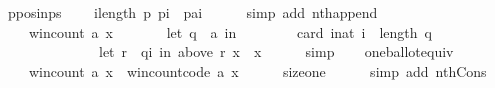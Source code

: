 \begin{isabellebody}
\ p{\isacharunderscore}{\kern0pt}pos{\isacharunderscore}{\kern0pt}in{\isacharunderscore}{\kern0pt}ps{\isacharcolon}{\kern0pt}\isanewline
\ \ \ \ {\isachardoublequoteopen}{\isasymforall}i{\isacharless}{\kern0pt}length\ p{\isachardot}{\kern0pt}\ p{\isacharbang}{\kern0pt}i\ {\isacharequal}{\kern0pt}\ {\isacharparenleft}{\kern0pt}p{\isacharat}{\kern0pt}{\isacharbrackleft}{\kern0pt}a{\isacharbrackright}{\kern0pt}{\isacharparenright}{\kern0pt}{\isacharbang}{\kern0pt}i{\isachardoublequoteclose}\isanewline
\ \ \ \ \isamarkupfalse%
\ {\isacharparenleft}{\kern0pt}simp\ add{\isacharcolon}{\kern0pt}\ nth{\isacharunderscore}{\kern0pt}append{\isacharparenright}{\kern0pt}\isanewline
\ \ \isamarkupfalse%
\isanewline
\ \ \ \ {\isachardoublequoteopen}win{\isacharunderscore}{\kern0pt}count\ {\isacharbrackleft}{\kern0pt}a{\isacharbrackright}{\kern0pt}\ x\ {\isacharequal}{\kern0pt}\isanewline
\ \ \ \ \ \ {\isacharparenleft}{\kern0pt}let\ q\ {\isacharequal}{\kern0pt}\ {\isacharbrackleft}{\kern0pt}a{\isacharbrackright}{\kern0pt}\ in\isanewline
\ \ \ \ \ \ \ \ card\ {\isacharbraceleft}{\kern0pt}i{\isacharcolon}{\kern0pt}{\isacharcolon}{\kern0pt}nat{\isachardot}{\kern0pt}\ i\ {\isacharless}{\kern0pt}\ length\ q\ {\isasymand}\isanewline
\ \ \ \ \ \ \ \ \ \ \ \ \ \ {\isacharparenleft}{\kern0pt}let\ r\ {\isacharequal}{\kern0pt}\ {\isacharparenleft}{\kern0pt}q{\isacharbang}{\kern0pt}i{\isacharparenright}{\kern0pt}\ in\ {\isacharparenleft}{\kern0pt}above\ r\ x\ {\isacharequal}{\kern0pt}\ {\isacharbraceleft}{\kern0pt}x{\isacharbraceright}{\kern0pt}{\isacharparenright}{\kern0pt}{\isacharparenright}{\kern0pt}{\isacharbraceright}{\kern0pt}{\isacharparenright}{\kern0pt}{\isachardoublequoteclose}\isanewline
\ \ \ \ \isamarkupfalse%
\ simp\isanewline
\ \ \isamarkupfalse%
\ one{\isacharunderscore}{\kern0pt}ballot{\isacharunderscore}{\kern0pt}equiv{\isacharcolon}{\kern0pt}\isanewline
\ \ \ \ {\isachardoublequoteopen}win{\isacharunderscore}{\kern0pt}count\ {\isacharbrackleft}{\kern0pt}a{\isacharbrackright}{\kern0pt}\ x\ {\isacharequal}{\kern0pt}\ win{\isacharunderscore}{\kern0pt}count{\isacharunderscore}{\kern0pt}code\ {\isacharbrackleft}{\kern0pt}a{\isacharbrackright}{\kern0pt}\ x{\isachardoublequoteclose}\isanewline
\ \ \ \ \isamarkupfalse%
\ size{\isacharunderscore}{\kern0pt}one\isanewline
\ \ \ \ \isamarkupfalse%
\ {\isacharparenleft}{\kern0pt}simp\ add{\isacharcolon}{\kern0pt}\ nth{\isacharunderscore}{\kern0pt}Cons{\isacharprime}{\kern0pt}{\isacharparenright}{\kern0pt}\isanewline
\ \ \isamarkupfalse%

\end{isabellebody}
